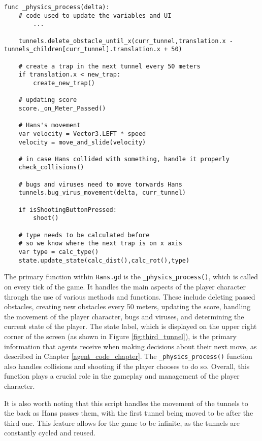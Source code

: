 \begin{lstlisting}
func _physics_process(delta): 
	# code used to update the variables and UI
		...
			
    tunnels.delete_obstacle_until_x(curr_tunnel,translation.x - tunnels_children[curr_tunnel].translation.x + 50)
    
    # create a trap in the next tunnel every 50 meters
    if translation.x < new_trap:
        create_new_trap()
    
    # updating score 
    score._on_Meter_Passed()
    
    # Hans's movement
    var velocity = Vector3.LEFT * speed
    velocity = move_and_slide(velocity)
    
    # in case Hans collided with something, handle it properly
    check_collisions()
    
    # bugs and viruses need to move torwards Hans    
    tunnels.bug_virus_movement(delta, curr_tunnel)
    
    if isShootingButtonPressed:
        shoot()
        
    # type needs to be calculated before 
    # so we know where the next trap is on x axis
    var type = calc_type()
    state.update_state(calc_dist(),calc_rot(),type)
\end{lstlisting}

The primary function within \texttt{Hans.gd} is the \texttt{\_physics\_process()}, which is called on every tick of the game. It handles the main aspects of the player character through the use of various methods and functions. These include deleting passed obstacles, creating new obstacles every 50 meters, updating the score, handling the movement of the player character, bugs and viruses, and determining the current state of the player. The state label, which is displayed on the upper right corner of the screen (as shown in Figure \ref{fig:third_tunnel}), is the primary information that agents receive when making decisions about their next move, as described in Chapter \ref{agent_code_chapter}. The \texttt{\_physics\_process()} function also handles collisions and shooting if the player chooses to do so. Overall, this function plays a crucial role in the gameplay and management of the player character.

It is also worth noting that this script handles the movement of the tunnels to the back as Hans passes them, with the first tunnel being moved to be after the third one. This feature allows for the game to be infinite, as the tunnels are constantly cycled and reused.

